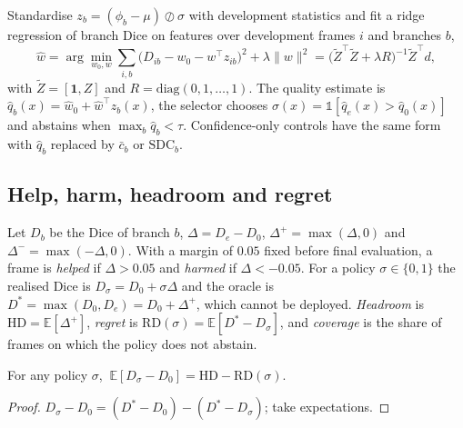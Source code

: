 \documentclass{midl}
\begin{document}
Standardise $z_b=(\phi_b-\mu)\oslash\sigma$ with development statistics and fit a ridge regression of branch Dice on features over development frames $i$ and branches $b$,
\begin{equation}
\hat w=\arg\min_{w_0,w}\sum_{i,b}\big(D_{ib}-w_0-w^{\top}z_{ib}\big)^2+\lambda\|w\|^2=\big(\tilde Z^{\top}\tilde Z+\lambda R\big)^{-1}\tilde Z^{\top}d,
\label{eq:ridge}
\end{equation}
with $\tilde Z=[\mathbf 1,Z]$ and $R=\mathrm{diag}(0,1,\dots,1)$. The quality estimate is $\hat q_b(x)=\hat w_0+\hat w^{\top}z_b(x)$, the selector chooses $\sigma(x)=\mathbb{1}[\hat q_e(x)>\hat q_0(x)]$ and abstains when $\max_b\hat q_b<\tau$. Confidence-only controls have the same form with $\hat q_b$ replaced by $\bar c_b$ or $\mathrm{SDC}_b$.

\subsection{Help, harm, headroom and regret}
Let $D_b$ be the Dice of branch $b$, $\Delta=D_e-D_0$, $\Delta^{+}=\max(\Delta,0)$ and $\Delta^{-}=\max(-\Delta,0)$. With a margin of $0.05$ fixed before final evaluation, a frame is \emph{helped} if $\Delta>0.05$ and \emph{harmed} if $\Delta<-0.05$. For a policy $\sigma\in\{0,1\}$ the realised Dice is $D_\sigma=D_0+\sigma\Delta$ and the oracle is $D^{*}=\max(D_0,D_e)=D_0+\Delta^{+}$, which cannot be deployed. \emph{Headroom} is $\mathrm{HD}=\mathbb{E}[\Delta^{+}]$, \emph{regret} is $\mathrm{RD}(\sigma)=\mathbb{E}[D^{*}-D_\sigma]$, and \emph{coverage} is the share of frames on which the policy does not abstain.

\begin{lemma}\label{lem:gain}
For any policy $\sigma$, $\ \mathbb{E}[D_\sigma-D_0]=\mathrm{HD}-\mathrm{RD}(\sigma)$.
\end{lemma}
\begin{proof}
$D_\sigma-D_0=(D^{*}-D_0)-(D^{*}-D_\sigma)$; take expectations.
\end{proof}
\end{document}
